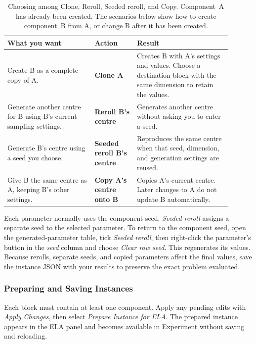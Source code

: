 \documentclass[journal,onecolumn]{IEEEtran}
\begin{document}
\begin{table}[H]
\centering
\small
\caption{Choosing among Clone, Reroll, Seeded reroll, and Copy. Component~A has already been created. The scenarios below show how to create component~B from A, or change B after it has been created.}
\label{tab:manual:generator-parameter-actions}
\begin{tabular}{@{}p{0.35\linewidth}p{0.17\linewidth}p{0.38\linewidth}@{}}
\toprule
\textbf{What you want} & \textbf{Action} & \textbf{Result} \\
\midrule
Create B as a complete copy of A. & \textbf{Clone A} & Creates B with A's settings and values. Choose a destination block with the same dimension to retain the values. \\
Generate another centre for B using B's current sampling settings. & \textbf{Reroll B's centre} & Generates another centre without asking you to enter a seed. \\
Generate B's centre using a seed you choose. & \textbf{Seeded reroll B's centre} & Reproduces the same centre when that seed, dimension, and generation settings are reused. \\
Give B the same centre as A, keeping B's other settings. & \textbf{Copy A's centre onto B} & Copies A's current centre. Later changes to A do not update B automatically. \\
\bottomrule
\end{tabular}
\end{table}

Each parameter normally uses the component seed. \emph{Seeded reroll} assigns a separate seed to the selected parameter. To return to the component seed, open the generated-parameter table, tick \emph{Seeded reroll}, then right-click the parameter's button in the \emph{seed} column and choose \emph{Clear row seed}. This regenerates its values. Because rerolls, separate seeds, and copied parameters affect the final values, save the instance JSON with your results to preserve the exact problem evaluated.

\subsubsection{Preparing and Saving Instances}
\label{ssec:manual:generator-preparation}

Each block must contain at least one component. Apply any pending edits with \emph{Apply Changes}, then select \emph{Prepare Instance for ELA}. The prepared instance appears in the ELA panel and becomes available in Experiment without saving and reloading.
\end{document}
